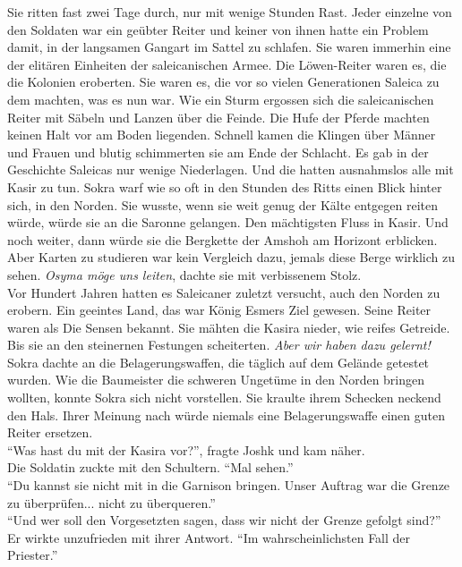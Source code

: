 Sie ritten fast zwei Tage durch, nur mit wenige Stunden Rast. Jeder einzelne von den Soldaten war 
ein geübter Reiter und keiner von ihnen hatte ein Problem damit, in der langsamen Gangart im Sattel 
zu schlafen. Sie waren immerhin eine der elitären Einheiten der saleicanischen Armee. Die 
Löwen-Reiter waren es, die die Kolonien eroberten. Sie waren es, die vor so vielen Generationen 
Saleica zu dem machten, was es nun war. Wie ein Sturm ergossen sich die saleicanischen Reiter mit 
Säbeln und Lanzen über die Feinde. Die Hufe der Pferde machten keinen Halt vor am Boden 
liegenden. Schnell kamen die Klingen über Männer und Frauen und blutig schimmerten sie am Ende 
der Schlacht. Es gab in der Geschichte Saleicas nur wenige Niederlagen. Und die hatten ausnahmslos 
alle mit Kasir zu tun. Sokra warf wie so oft in den Stunden des Ritts einen Blick hinter sich, in 
den Norden. Sie wusste, wenn sie weit genug der Kälte entgegen reiten würde, würde sie an die 
Saronne gelangen. Den mächtigsten Fluss in Kasir. Und noch weiter, dann würde sie die Bergkette der 
Amshoh am Horizont erblicken. Aber Karten zu studieren war kein Vergleich dazu, jemals diese Berge 
wirklich zu sehen. \textit{Osyma möge uns leiten}, dachte sie mit verbissenem Stolz.\\
Vor Hundert Jahren hatten es Saleicaner zuletzt versucht, auch den Norden zu erobern. Ein geeintes 
Land, das war König Esmers Ziel gewesen. Seine Reiter waren als Die Sensen bekannt. Sie mähten die 
Kasira nieder, wie reifes Getreide. Bis sie an den steinernen Festungen scheiterten. \textit{Aber 
wir haben dazu gelernt!}\\
Sokra dachte an die Belagerungswaffen, die täglich auf dem Gelände getestet wurden. Wie die 
Baumeister die schweren Ungetüme in den Norden bringen wollten, konnte Sokra sich nicht vorstellen. 
Sie kraulte ihrem Schecken neckend den Hals. Ihrer Meinung nach würde niemals eine Belagerungswaffe 
einen guten Reiter ersetzen.\\
``Was hast du mit der Kasira vor?'', fragte Joshk und kam näher.\\
Die Soldatin zuckte mit den Schultern. ``Mal sehen.''\\
``Du kannst sie nicht mit in die Garnison bringen. Unser Auftrag war die Grenze zu überprüfen... 
nicht zu überqueren.''\\
``Und wer soll den Vorgesetzten sagen, dass wir nicht der Grenze gefolgt sind?''\\
Er wirkte unzufrieden mit ihrer Antwort. ``Im wahrscheinlichsten Fall der Priester.''\\
